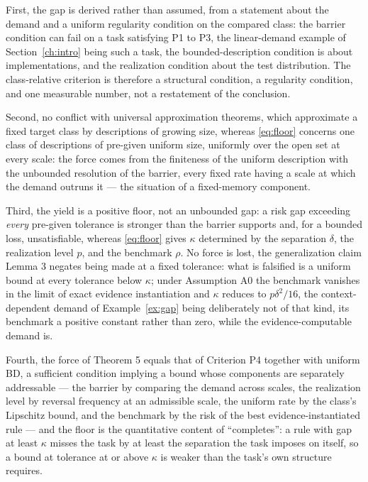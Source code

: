 First, the gap is derived rather than assumed, from a statement about the demand and a uniform regularity condition on the compared class: the barrier condition can fail on a task satisfying P1 to P3, the linear-demand example of Section~\ref{ch:intro} being such a task, the bounded-description condition is about implementations, and the realization condition about the test distribution. The class-relative criterion is therefore a structural condition, a regularity condition, and one measurable number, not a restatement of the conclusion.

Second, no conflict with universal approximation theorems, which approximate a fixed target class by descriptions of growing size, whereas \eqref{eq:floor} concerns one class of descriptions of pre-given uniform size, uniformly over the open set at every scale: the force comes from the finiteness of the uniform description with the unbounded resolution of the barrier, every fixed rate having a scale at which the demand outruns it --- the situation of a fixed-memory component.

Third, the yield is a positive floor, not an unbounded gap: a risk gap exceeding \emph{every} pre-given tolerance is stronger than the barrier supports and, for a bounded loss, unsatisfiable, whereas \eqref{eq:floor} gives $\kappa$ determined by the separation $\delta$, the realization level $p$, and the benchmark $\rho$. No force is lost, the generalization claim Lemma 3 negates being made at a fixed tolerance: what is falsified is a uniform bound at every tolerance below $\kappa$; under Assumption A0 the benchmark vanishes in the limit of exact evidence instantiation and $\kappa$ reduces to $p \delta^2 / 16$, the context-dependent demand of Example~\ref{ex:gap} being deliberately not of that kind, its benchmark a positive constant rather than zero, while the evidence-computable demand is.

Fourth, the force of Theorem 5 equals that of Criterion P4 together with uniform BD, a sufficient condition implying a bound whose components are separately addressable --- the barrier by comparing the demand across scales, the realization level by reversal frequency at an admissible scale, the uniform rate by the class's Lipschitz bound, and the benchmark by the risk of the best evidence-instantiated rule --- and the floor is the quantitative content of ``completes'': a rule with gap at least $\kappa$ misses the task by at least the separation the task imposes on itself, so a bound at tolerance at or above $\kappa$ is weaker than the task's own structure requires.

